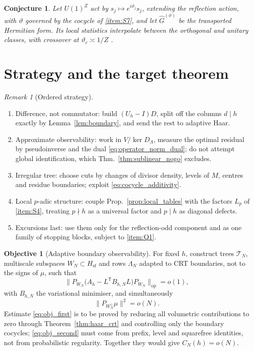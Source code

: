 \documentclass[11pt]{amsart}
\numberwithin{equation}{section}
\theoremstyle{plain}
\newtheorem{conjecture}[theorem]{Conjecture}
\theoremstyle{definition}
\newtheorem{objective}[theorem]{Objective}
\theoremstyle{remark}
\newtheorem{remark}[theorem]{Remark}
\begin{document}
\begin{conjecture}
\label{conj:twisted_orientation_bits}
Let $U(1)^Z$ act by $s_j\mapsto e^{i\vartheta_j}s_j$, extending the
reflection action, with $\vartheta$ governed by the cocycle of
\ref{item:S7}, and let $\widehat G^{(\vartheta)}$ be the transported
Hermitian form. Its local statistics interpolate between the orthogonal
and unitary classes, with crossover at $\vartheta_c\asymp1/Z$
\cite{PandeyMehta1983}.
\end{conjecture}

\section{Strategy and the target theorem}
\label{sec:strategy}

\begin{remark}[Ordered strategy]
\label{rem:ordered_strategy}
\begin{enumerate}[label=(\roman*)]
\item Difference, not commutator: build $(U_h-I)D$, split off the
columns $d\mid h$ exactly by Lemma~\ref{lem:boundary}, and send the rest
to adaptive Haar.
\item Approximate observability: work in $V/\ker D_\Lambda$, measure the
optimal residual by pseudoinverse and the dual
\eqref{eq:operator_norm_dual}; do not attempt global identification,
which Thm.~\ref{thm:sublinear_nogo} excludes.
\item Irregular tree: choose cuts by changes of divisor density, levels
of $M$, centres and residue boundaries; exploit
\eqref{eq:cocycle_additivity}.
\item Local $p$-adic structure: couple
Prop.~\ref{prop:local_tables} with the factors $L_p$ of \ref{item:S4},
treating $p\nmid h$ as a universal factor and $p\mid h$ as diagonal
defects.
\item Excursions last: use them only for the reflection-odd component
and as one family of stopping blocks, subject to \ref{item:Q1}.
\end{enumerate}
\end{remark}

\begin{objective}[Adaptive boundary observability]
\label{obj:adaptive_boundary}
For fixed $h$, construct trees $\mathcal T_N$, multiscale subspaces
$W_N\subset H_{\mathrm{sf}}$ and rows $\Lambda_N$ adapted to CRT
boundaries, not to the signs of $\mu$, such that
\begin{equation}
\bigl\|P_{W_N}\bigl(A_h-L^{\mathsf T}B_{h,N}L\bigr)P_{W_N}\bigr\|_{\mathrm{op}}
=o(1),
\label{eq:obj_first}
\end{equation}
with $B_{h,N}$ the variational minimiser, and simultaneously
\begin{equation}
\bigl\|P_{W_N^{\perp}}\mu\bigr\|^2=o(N).
\label{eq:obj_second}
\end{equation}
Estimate \eqref{eq:obj_first} is to be proved by reducing all volumetric
contributions to zero through Theorem~\ref{thm:haar_crt} and controlling
only the boundary cocycles; \eqref{eq:obj_second} must come from prefix,
level and squarefree identities, not from probabilistic regularity.
Together they would give $C_N(h)=o(N)$.
\end{objective}
\end{document}
